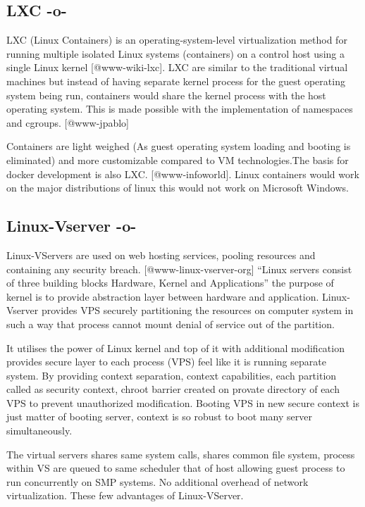 \subsection{LXC -o-}
     
LXC (Linux Containers) is an operating-system-level virtualization
method for running multiple isolated Linux systems (containers) on a
control host using a single Linux kernel [@www-wiki-lxc]. LXC are
similar to the traditional virtual machines but instead of having
separate kernel process for the guest operating system being run,
containers would share the kernel process with the host operating
system. This is made possible with the implementation of namespaces
and cgroups. [@www-jpablo]

Containers are light weighed (As guest operating system loading and
booting is eliminated) and more customizable compared to VM
technologies.The basis for docker development is also
LXC. [@www-infoworld]. Linux containers would work on the major
distributions of linux this would not work on Microsoft Windows.
  
\subsection{Linux-Vserver -o-}

Linux-VServers are used on web hosting services, pooling resources and
containing any security breach. [@www-linux-vserver-org] ``Linux
servers consist of three building blocks Hardware, Kernel and
Applications'' the purpose of kernel is to provide abstraction layer
between hardware and application. Linux-Vserver provides VPS securely
partitioning the resources on computer system in such a way that
process cannot mount denial of service out of the partition.
     
It utilises the power of Linux kernel and top of it with additional
modification provides secure layer to each process (VPS) feel like it
is running separate system.  By providing context separation, context
capabilities, each partition called as security context, chroot
barrier created on provate directory of each VPS to prevent
unauthorized modification. Booting VPS in new secure context is just
matter of booting server, context is so robust to boot many server
simultaneously.
     
The virtual servers shares same system calls, shares common file
system, process within VS are queued to same scheduler that of host
allowing guest process to run concurrently on SMP systems. No
additional overhead of network virtualization.  These few advantages
of Linux-VServer.

